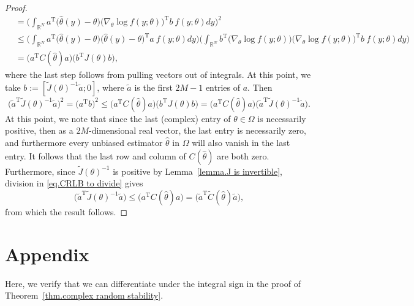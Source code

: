 \documentclass[times,10pt]{elsarticle}
\theoremstyle{plain}
\begin{document}
\begin{proof}
\begin{align*}
&=\bigg(\int_{\mathbb{R}^N}a^\mathrm{T}\big(\hat{\theta}(y)-\theta\big)\big(\nabla_\theta\log f(y;\theta)\big)^\mathrm{T}b~f(y;\theta)dy\bigg)^2\\
&\leq\bigg(\int_{\mathbb{R}^N}a^\mathrm{T}\big(\hat{\theta}(y)-\theta\big)\big(\hat{\theta}(y)-\theta\big)^\mathrm{T}a~f(y;\theta)dy\bigg)\bigg(\int_{\mathbb{R}^N}b^\mathrm{T}\big(\nabla_\theta\log f(y;\theta)\big)\big(\nabla_\theta\log f(y;\theta)\big)^\mathrm{T}b~f(y;\theta)dy\bigg)\\
&=\big(a^\mathrm{T}C(\hat{\theta})a\big)\big(b^\mathrm{T}J(\theta)b\big),
\end{align*}
where the last step follows from pulling vectors out of integrals.
At this point, we take $b:=[\widetilde{J}(\theta)^{-1}\tilde{a}; 0]$, where $\tilde{a}$ is the first $2M-1$ entries of $a$.
Then
\begin{equation}
\label{eq.CRLB to divide}
\big(\tilde{a}^\mathrm{T}\widetilde{J}(\theta)^{-1}\tilde{a}\big)^2
=\big(a^\mathrm{T}b\big)^2
\leq\big(a^\mathrm{T}C(\hat{\theta})a\big)\big(b^\mathrm{T}J(\theta)b\big)
=\big(a^\mathrm{T}C(\hat{\theta})a\big)\big(\tilde{a}^\mathrm{T}\widetilde{J}(\theta)^{-1}\tilde{a}\big).
\end{equation}
At this point, we note that since the last (complex) entry of $\theta\in\Omega$ is necessarily positive, then as a $2M$-dimensional real vector, the last entry is necessarily zero, and furthermore every unbiased estimator $\hat{\theta}$ in $\Omega$ will also vanish in the last entry.
It follows that the last row and column of $C(\hat{\theta})$ are both zero.
Furthermore, since $\widetilde{J}(\theta)^{-1}$ is positive by Lemma~\ref{lemma.J is invertible}, division in \eqref{eq.CRLB to divide} gives
\begin{equation*}
\big(\tilde{a}^\mathrm{T}\widetilde{J}(\theta)^{-1}\tilde{a}\big)
\leq\big(a^\mathrm{T}C(\hat{\theta})a\big)
=\big(\tilde{a}^\mathrm{T}\widetilde{C}(\hat{\theta})\tilde{a}\big),
\end{equation*}
from which the result follows.
\qquad
\end{proof}

\section*{Appendix}

Here, we verify that we can differentiate under the integral sign in the proof of Theorem~\ref{thm.complex random stability}.
\end{document}

